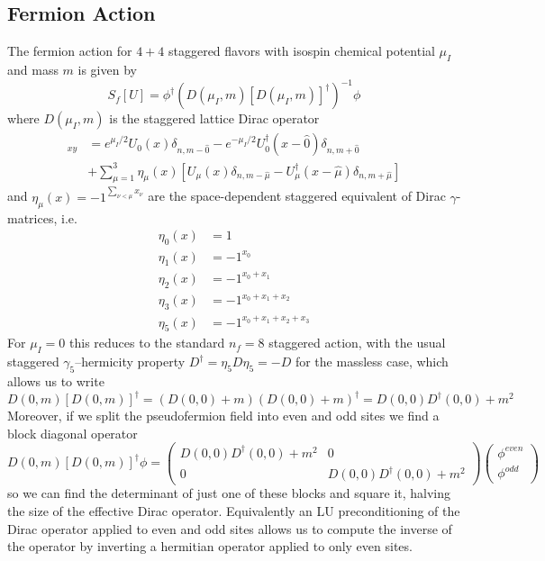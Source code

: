 \documentclass[a4paper,12pt]{article}
\begin{document}
\subsection{Fermion Action}
The fermion action for $4+4$ staggered flavors with isospin chemical potential $\mu_I$ and mass $m$ is given by
\begin{equation}
\label{eq:action_fermion}
 S_f[U] = \phi^{\dagger} (D(\mu_I,m) [D(\mu_I,m)]^{\dagger})^{-1} \phi
\end{equation}
where $D(\mu_I,m)$ is the staggered lattice Dirac operator
\begin{align}
 [D(\mu_I,m)]_{xy} &= e^{\mu_I/2} U_{0}(x) \delta_{n,m-\hat0} - e^{-\mu_I/2} U_{0}^{\dagger}(x-\hat0) \delta_{n,m+\hat0} \\
 &+ \sum_{\mu=1}^{3} \eta_{\mu}(x) \left[ U_{\mu}(x) \delta_{n,m-\hat\mu} - U_{\mu}^{\dagger}(x-\hat\mu) \delta_{n,m+\hat\mu} \right]
\end{align}
and $\eta_{\mu}(x) = -1^{\sum_{\nu<\mu}x_{\nu}}$ are the space-dependent staggered equivalent of Dirac $\gamma$-matrices, i.e.
\begin{align}
 \eta_{0}(x) &= 1 \\
 \eta_{1}(x) &= -1^{x_0} \\
 \eta_{2}(x) &= -1^{x_0+x_1} \\
 \eta_{3}(x) &= -1^{x_0+x_1+x_2} \\
 \eta_{5}(x) &= -1^{x_0+x_1+x_2+x_3}
\end{align}
For $\mu_I=0$ this reduces to the standard $n_f=8$ staggered action, with the usual staggered $\gamma_5$--hermicity property $D^{\dagger} = \eta_5 D \eta_5 = -D$ for the massless case, 
which allows us to write 
\begin{equation}
D(0,m) [D(0,m)]^{\dagger} = (D(0,0) + m)(D(0,0) + m)^{\dagger} = D(0,0)D^{\dagger}(0,0) + m^2
\end{equation}
Moreover, if we split the pseudofermion field into even and odd sites we find a block diagonal operator
\begin{equation}
D(0,m) [D(0,m)]^{\dagger} \phi = 
\begin{pmatrix}
D(0,0)D^{\dagger}(0,0) + m^2 & 0 \\
0 & D(0,0)D^{\dagger}(0,0) + m^2
\end{pmatrix}
\begin{pmatrix}
\phi^{even} \\
\phi^{odd}
\end{pmatrix}
\end{equation}
so we can find the determinant of just one of these blocks and square it, halving the size of the effective Dirac operator. Equivalently an LU preconditioning of the Dirac operator 
applied to even and odd sites allows us to compute the inverse of the operator by inverting a hermitian operator applied to only even sites.
\end{document}
